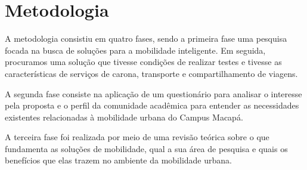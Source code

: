 \section{Metodologia}
A metodologia consistiu em quatro fases, sendo a primeira fase uma pesquisa focada na busca de soluções para a mobilidade inteligente. Em seguida, procuramos uma solução que tivesse condições de realizar testes e tivesse as características de serviços de carona, transporte e compartilhamento de viagens.

A segunda fase consiste na aplicação de um questionário para analisar o interesse pela proposta e o perfil da comunidade acadêmica para entender as necessidades existentes relacionadas à mobilidade urbana do Campus Macapá.

A terceira fase foi realizada por meio de uma revisão teórica sobre o que fundamenta as soluções de mobilidade, qual a sua área de pesquisa e quais os benefícios que elas trazem no ambiente da mobilidade urbana.

\begin{comment}

A metodologia foi composta de quatro fases, onde a primeira é constituída da aplicação de um questionário para analisar o interesse em relação a proposta e o perfil da comunidade acadêmica, buscando entender quais as necessidades existentes relacionadas a Mobilidade Urbana do Campus Macapá.

A segunda fase realizou-se mediante revisão teórica sobre o que fundamenta soluções de mobilidade, qual é a sua área de estudo e o que trazem de benefícios no ambiente de Mobilidade Urbana.

Na terceira fase foi realizada uma pesquisa na qual o objetivo foi encontrar soluções de Mobilidade Inteligente. Após, buscamos pela solução que apresentasse condições para que pudéssemos realizar testes e que tivesse características de serviços de caronas, transporte e compartilhamento de viagens. 
\end{comment}

